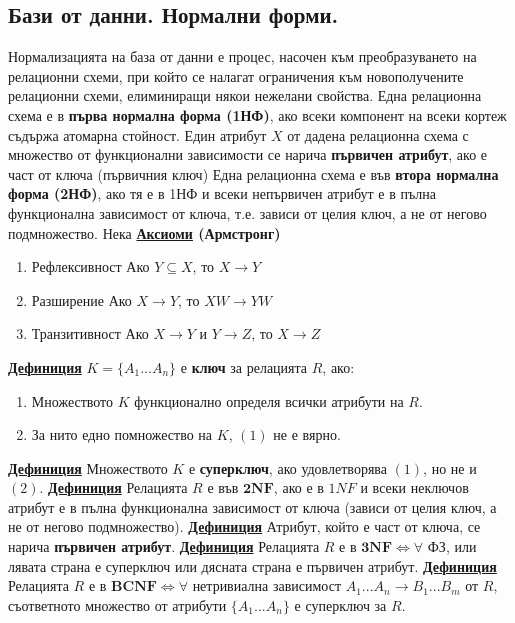 \documentclass{article}
\begin{document}
\subsection*{Бази от данни. Нормални форми.}

Нормализацията на база от данни е процес, насочен към преобразуването на релационни схеми, при който се налагат ограничения
към новополучените релационни схеми, елиминиращи някои нежелани свойства.
Една релационна схема е в \textbf{първа нормална форма (1НФ)}, ако всеки компонент на всеки кортеж съдържа атомарна стойност.
Един атрибут $X$ от дадена релационна схема с множество от функционални зависимости се нарича \textbf{първичен атрибут}, ако е
част от ключа (първичния ключ)
Една релационна схема е във \textbf{втора нормална форма (2НФ)}, ако тя е в 1НФ и всеки непървичен атрибут е в пълна функционална
зависимост от ключа, т.е. зависи от целия ключ, а не от негово подмножество.
Нека 
\textbf{\underline{Аксиоми} (Армстронг)}
\begin{enumerate}
    \item Рефлексивност \newline
    Ако $Y \subseteq X$, то $X \rightarrow Y$
    \item Разширение \newline
    Ако $X \rightarrow Y$, то $XW \rightarrow YW$
    \item Транзитивност \newline
    Ако $X \rightarrow Y$ и $Y \rightarrow Z$, то $X \rightarrow Z$
\end{enumerate}
\textbf{\underline{Дефиниция}}
$K = \{A_1...A_n\}$ е \textbf{ключ} за релацията $R$, ако:
\begin{enumerate}
    \item Множеството $K$ функционално определя всички атрибути на $R$.
    \item За нито едно помножество на $K$, $(1)$ не е вярно.    
\end{enumerate}
\textbf{\underline{Дефиниция}}
Множеството $K$ е \textbf{суперключ}, ако удовлетворява $(1)$, но не и $(2)$. \newline\newline
\textbf{\underline{Дефиниция}}
Релацията $R$ е във $\mathbf{2NF}$, ако е в $1NF$ и всеки неключов атрибут е в пълна функционална зависимост от ключа
(зависи от целия ключ, а не от негово подмножество). \newline\newline
\textbf{\underline{Дефиниция}}
Атрибут, който е част от ключа, се нарича \textbf{първичен атрибут}. \newline\newline
\textbf{\underline{Дефиниция}}
Релацията $R$ е в $\mathbf{3NF} \iff \forall$ ФЗ, или лявата страна е суперключ или дясната страна е първичен атрибут. \newline\newline
\textbf{\underline{Дефиниция}}
Релацията $R$ е в $\mathbf{BCNF} \iff \forall$ нетривиална зависимост $A_1...A_n \rightarrow B_1...B_m$ от $R$,
съответното множество от атрибути $\{A_1...A_n\}$ е суперключ за $R$. \newline\newline
\end{document}
